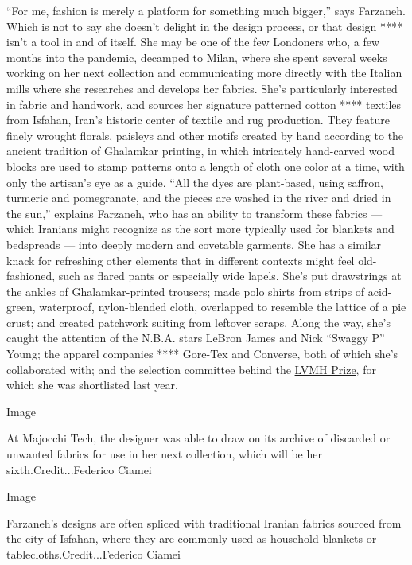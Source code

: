 ``For me, fashion is merely a platform for something much bigger,'' says
Farzaneh. Which is not to say she doesn't delight in the design process,
or that design **** isn't a tool in and of itself. She may be one of the
few Londoners who, a few months into the pandemic, decamped to Milan,
where she spent several weeks working on her next collection and
communicating more directly with the Italian mills where she researches
and develops her fabrics. She's particularly interested in fabric and
handwork, and sources her signature patterned cotton **** textiles from
Isfahan, Iran's historic center of textile and rug production. They
feature finely wrought florals, paisleys and other motifs created by
hand according to the ancient tradition of Ghalamkar printing, in which
intricately hand-carved wood blocks are used to stamp patterns onto a
length of cloth one color at a time, with only the artisan's eye as a
guide. ``All the dyes are plant-based, using saffron, turmeric and
pomegranate, and the pieces are washed in the river and dried in the
sun,'' explains Farzaneh, who has an ability to transform these fabrics
--- which Iranians might recognize as the sort more typically used for
blankets and bedspreads --- into deeply modern and covetable garments.
She has a similar knack for refreshing other elements that in different
contexts might feel old-fashioned, such as flared pants or especially
wide lapels. She's put drawstrings at the ankles of Ghalamkar-printed
trousers; made polo shirts from strips of acid-green, waterproof,
nylon-blended cloth, overlapped to resemble the lattice of a pie crust;
and created patchwork suiting from leftover scraps. Along the way, she's
caught the attention of the N.B.A. stars LeBron James and Nick ``Swaggy
P'' Young; the apparel companies **** Gore-Tex and Converse, both of
which she's collaborated with; and the selection committee behind the
\href{https://www.lvmhprize.com/designer/paria-farzaneh/}{LVMH Prize},
for which she was shortlisted last year.

Image

At Majocchi Tech, the designer was able to draw on its archive of
discarded or unwanted fabrics for use in her next collection, which will
be her sixth.Credit...Federico Ciamei

Image

Farzaneh's designs are often spliced with traditional Iranian fabrics
sourced from the city of Isfahan, where they are commonly used as
household blankets or tablecloths.Credit...Federico Ciamei

